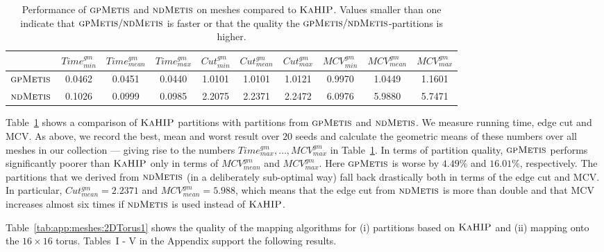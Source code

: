 \documentclass[pdftex]{llncs}
\newcommand{\gpmetis}{\textsc{gpMetis}\xspace}
\newcommand{\ndmetis}{\textsc{ndMetis}\xspace}
\newcommand{\kahip}{\textsc{KaHIP}\xspace}
\begin{document}
\begin{table}[htb]
  \caption{Performance of $\gpmetis$ and $\ndmetis$ on meshes compared
    to $\kahip$. Values smaller than one indicate that
    $\gpmetis\slash\ndmetis$ is faster or that the quality the
    $\gpmetis\slash\ndmetis$-partitions is higher.}
\begin{center}
\begin{tabular}{ l | c c c | c c c | c c c}
           & $Time^{gm}_{min}$ & $Time^{gm}_{mean}$ &
    $Time^{gm}_{max}$ & $Cut^{gm}_{min}$ & $Cut^{gm}_{mean}$ &
    $Cut^{gm}_{max}$ & $MCV^{gm}_{min}$ & $MCV^{gm}_{mean}$ &
    $MCV^{gm}_{max}$ \\\hline \hline

    $\gpmetis$ & 0.0462 & 0.0451 & 0.0440 & 1.0101 & 1.0101 & 1.0121 & 0.9970 & 1.0449 & 1.1601\\
    $\ndmetis$ & 0.1026 & 0.0999 & 0.0985 & 2.2075 & 2.2371 & 2.2472 & 6.0976 & 5.9880 & 5.7471  
\end{tabular}
\end{center}
\label{tab:meansQuot}
\end{table}

Table~\ref{tab:meansQuot} shows a comparison of $\kahip$ partitions
with partitions from $\gpmetis$ and $\ndmetis$. We measure running
time, edge cut and MCV. As above, we record the best, mean and worst
result over $20$ seeds and calculate the geometric means of these
numbers over all meshes in our collection --- giving rise to the
numbers $Time^{gm}_{max}, \dots, MCV^{gm}_{max}$ in
Table~\ref{tab:meansQuot}. In terms of partition quality, $\gpmetis$
performs significantly poorer than $\kahip$ only in terms of
$MCV^{gm}_{mean}$ and $MCV^{gm}_{max}$. Here $\gpmetis$ is worse by
$4.49\%$ and $16.01\%$, respectively.
The partitions that we derived from $\ndmetis$ (in a deliberately
sub-optimal way) fall back drastically both in terms of the edge cut
and MCV. In particular, $Cut^{gm}_{mean} = 2.2371$ and
$MCV^{gm}_{mean} = 5.988$, which means that the edge cut from
$\ndmetis$ is more than double and that MCV increases almost six times
if $\ndmetis$ is used instead of $\kahip$.

Table~\ref{tab:app:meshes:2DTorus1} shows the quality of the mapping
algorithms for (i) partitions based on $\kahip$ and (ii) mapping onto
the $16 \times 16$ torus. Tables~I - V in the Appendix support the
following results.
\end{document}
